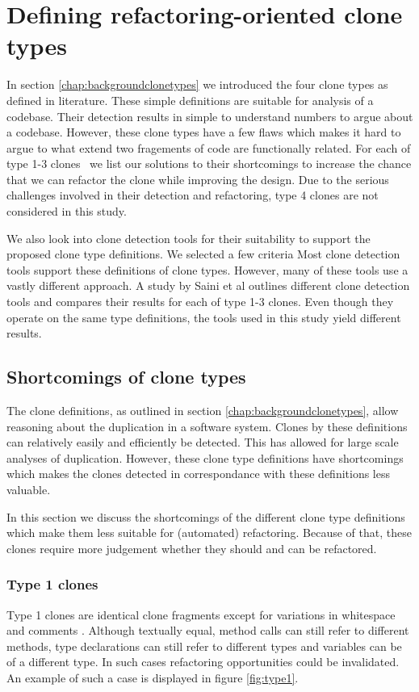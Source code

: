 \chapter{Defining refactoring-oriented clone types}\label{chap:clonetypes}
In section \ref{chap:backgroundclonetypes} we introduced the four clone types as defined in literature. These simple definitions are suitable for analysis of a codebase. Their detection results in simple to understand numbers to argue about a codebase. However, these clone types have a few flaws which makes it hard to argue to what extend two fragements of code are functionally related. For each of type 1-3 clones~\cite{roy2007survey} we list our solutions to their shortcomings to increase the chance that we can refactor the clone while improving the design. Due to the serious challenges involved in their detection and refactoring, type 4 clones are not considered in this study.

We also look into clone detection tools for their suitability to support the proposed clone type definitions. We selected a few criteria  Most clone detection tools support these definitions of clone types. However, many of these tools use a vastly different approach. A study by Saini et al \cite{saini2018towards} outlines different clone detection tools and compares their results for each of type 1-3 clones. Even though they operate on the same type definitions, the tools used in this study yield different results.

\section{Shortcomings of clone types}
The clone definitions, as outlined in section \ref{chap:backgroundclonetypes}, allow reasoning about the duplication in a software system. Clones by these definitions can relatively easily and efficiently be detected. This has allowed for large scale analyses of duplication. However, these clone type definitions have shortcomings which makes the clones detected in correspondance with these definitions less valuable.

In this section we discuss the shortcomings of the different clone type definitions which make them less suitable for (automated) refactoring. Because of that, these clones require more judgement whether they should and can be refactored.

\subsection{Type 1 clones} \label{chap:type1clones}
Type 1 clones are identical clone fragments except for variations in whitespace and comments \cite{roy2007survey}. Although textually equal, method calls can still refer to different methods, type declarations can still refer to different types and variables can be of a different type. In such cases refactoring opportunities could be invalidated. An example of such a case is displayed in figure \ref{fig:type1}.

